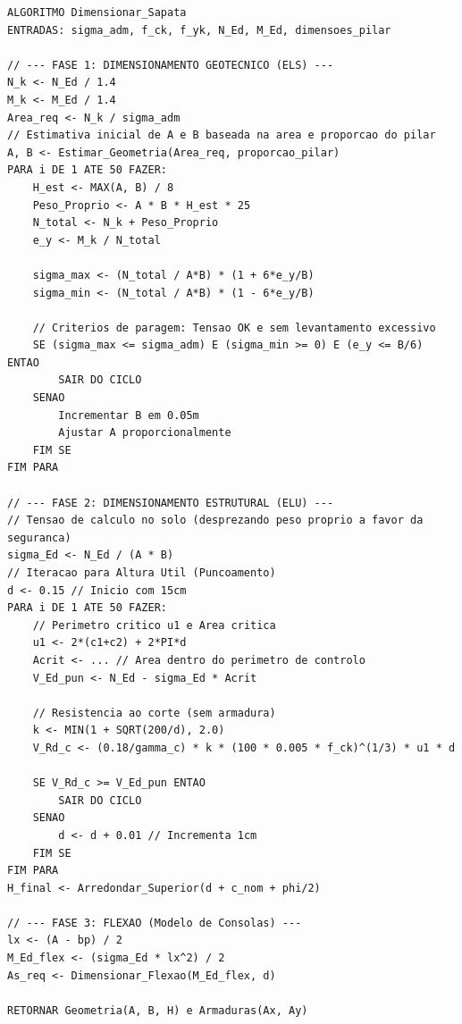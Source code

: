 \begin{lstlisting}[style=PseudoStyle, basicstyle=\ttfamily\normalsize, caption={Dimensionamento de sapatas (sapata\_service.py)}, label={alg:sapata}]
ALGORITMO Dimensionar_Sapata
ENTRADAS: sigma_adm, f_ck, f_yk, N_Ed, M_Ed, dimensoes_pilar

// --- FASE 1: DIMENSIONAMENTO GEOTECNICO (ELS) ---
N_k <- N_Ed / 1.4
M_k <- M_Ed / 1.4
Area_req <- N_k / sigma_adm
// Estimativa inicial de A e B baseada na area e proporcao do pilar
A, B <- Estimar_Geometria(Area_req, proporcao_pilar)
PARA i DE 1 ATE 50 FAZER:
    H_est <- MAX(A, B) / 8
    Peso_Proprio <- A * B * H_est * 25
    N_total <- N_k + Peso_Proprio
    e_y <- M_k / N_total
    
    sigma_max <- (N_total / A*B) * (1 + 6*e_y/B)
    sigma_min <- (N_total / A*B) * (1 - 6*e_y/B)
    
    // Criterios de paragem: Tensao OK e sem levantamento excessivo
    SE (sigma_max <= sigma_adm) E (sigma_min >= 0) E (e_y <= B/6) ENTAO
        SAIR DO CICLO
    SENAO
        Incrementar B em 0.05m
        Ajustar A proporcionalmente
    FIM SE
FIM PARA

// --- FASE 2: DIMENSIONAMENTO ESTRUTURAL (ELU) ---
// Tensao de calculo no solo (desprezando peso proprio a favor da seguranca)
sigma_Ed <- N_Ed / (A * B)
// Iteracao para Altura Util (Puncoamento)
d <- 0.15 // Inicio com 15cm
PARA i DE 1 ATE 50 FAZER:
    // Perimetro critico u1 e Area critica
    u1 <- 2*(c1+c2) + 2*PI*d
    Acrit <- ... // Area dentro do perimetro de controlo
    V_Ed_pun <- N_Ed - sigma_Ed * Acrit
    
    // Resistencia ao corte (sem armadura)
    k <- MIN(1 + SQRT(200/d), 2.0)
    V_Rd_c <- (0.18/gamma_c) * k * (100 * 0.005 * f_ck)^(1/3) * u1 * d
    
    SE V_Rd_c >= V_Ed_pun ENTAO
        SAIR DO CICLO
    SENAO
        d <- d + 0.01 // Incrementa 1cm
    FIM SE
FIM PARA
H_final <- Arredondar_Superior(d + c_nom + phi/2)

// --- FASE 3: FLEXAO (Modelo de Consolas) ---
lx <- (A - bp) / 2
M_Ed_flex <- (sigma_Ed * lx^2) / 2
As_req <- Dimensionar_Flexao(M_Ed_flex, d)

RETORNAR Geometria(A, B, H) e Armaduras(Ax, Ay)
\end{lstlisting}

